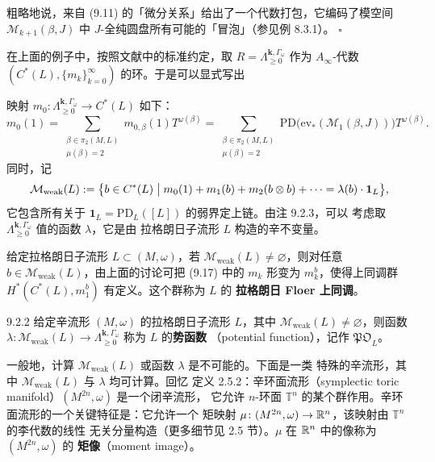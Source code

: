 粗略地说，来自 (9.11) 的「微分关系」给出了一个代数打包，它编码了模空间
$\mathcal M_{k+1}(\beta,J)$ 中 $J$-全纯圆盘所有可能的「冒泡」（参见例 8.3.1）。
\hfill$\square$

在上面的例子中，按照文献中的标准约定，取
$R=\Lambda^{\mathbf{k},\Gamma_\omega}_{\geqslant0}$ 作为 $A_\infty$-代数
$(C^*(L),\{m_k\}_{k=0}^\infty)$ 的环。于是可以显式写出

映射 $m_0\colon\Lambda^{\mathbf{k},\Gamma_\omega}_{\geqslant0}\to C^*(L)$ 如下：
\begin{equation*}
  m_0(1)=\sum_{\substack{\beta\in\pi_2(M,L)\\\mu(\beta)=2}}
  m_{0,\beta}(1)T^{\omega(\beta)}
  =\sum_{\substack{\beta\in\pi_2(M,L)\\\mu(\beta)=2}}
  \mathrm{PD}\bigl(\mathrm{ev}_*(\mathcal M_1(\beta,J))\bigr)T^{\omega(\beta)}.
\end{equation*}
同时，记
\begin{equation*}
  \mathcal M_{\mathrm{weak}}(L)
  :=\bigl\{b\in C^*(L)\bigm|m_0(1)+m_1(b)+m_2(b\otimes b)+\cdots
  =\lambda(b)\cdot\mathbf{1}_L\bigr\},
\end{equation*}
它包含所有关于 $\mathbf{1}_L=\mathrm{PD}_L([L])$ 的弱界定上链。由注 9.2.3，可以
考虑取 $\Lambda^{\mathbf{k},\Gamma_\omega}_{\geqslant0}$ 值的函数 $\lambda$，它是由
拉格朗日子流形 $L$ 构造的辛不变量。

给定拉格朗日子流形 $L\subset(M,\omega)$，若
$\mathcal M_{\mathrm{weak}}(L)\neq\varnothing$，则对任意
$b\in\mathcal M_{\mathrm{weak}}(L)$，由上面的讨论可把 (9.17) 中的 $m_k$ 形变为
$m_k^b$，使得上同调群 $H^*(C^*(L),m_1^b)$ 有定义。这个群称为 $L$ 的
\textbf{拉格朗日 Floer 上同调}。

\begin{wdefn}{9.2.2}
  给定辛流形 $(M,\omega)$ 的拉格朗日子流形 $L$，其中
  $\mathcal M_{\mathrm{weak}}(L)\neq\varnothing$，则函数
  $\lambda\colon\mathcal M_{\mathrm{weak}}(L)\to
  \Lambda^{\mathbf{k},\Gamma_\omega}_{\geqslant0}$ 称为 $L$ 的\textbf{势函数}
  （potential function），记作 $\mathfrak{PO}_L$。
\end{wdefn}

一般地，计算 $\mathcal M_{\mathrm{weak}}(L)$ 或函数 $\lambda$ 是不可能的。下面是一类
特殊的辛流形，其中 $\mathcal M_{\mathrm{weak}}(L)$ 与 $\lambda$ 均可计算。回忆
定义 2.5.2：辛环面流形（symplectic toric manifold）$(M^{2n},\omega)$ 是一个闭辛流形，
它允许 $n$-环面 $\mathbb{T}^n$ 的某个群作用。辛环面流形的一个关键特征是：它允许一个
矩映射 $\mu\colon(M^{2n},\omega)\to\mathbb{R}^n$，该映射由 $\mathbb{T}^n$ 的李代数的线性
无关分量构造（更多细节见 2.5 节）。$\mu$ 在 $\mathbb{R}^n$ 中的像称为 $(M^{2n},\omega)$ 的
\textbf{矩像}（moment image）。

